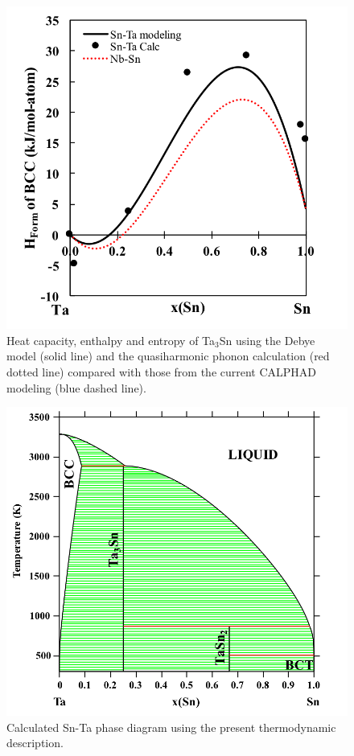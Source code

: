 \pagebreak
\begin{figure}[H]
	\centering
	\includegraphics[width=\textwidth]{Chapter-4/Figures/HofForm.png}
	\caption{Heat capacity, enthalpy and entropy of Ta$_3$Sn using the Debye model (solid line) and the quasiharmonic phonon calculation (red dotted line) compared with those from the current CALPHAD modeling (blue dashed line).}
	\label{Ch4-figure:HofForm}
\end{figure}

\pagebreak
\begin{figure}[H]
	\centering
	\includegraphics[width=\textwidth]{Chapter-4/Figures/SnTaPD.png}
	\caption{Calculated Sn-Ta phase diagram using the present thermodynamic description.}
	\label{Ch4-figure:SnTaPD}
\end{figure}

